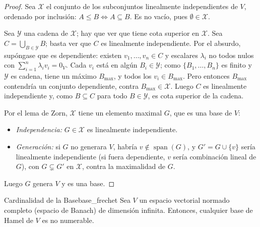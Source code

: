 \documentclass[11pt, a4paper]{article}
\begin{document}
\begin{proof}
Sea $\mathcal{X}$ el conjunto de los subconjuntos linealmente independientes de $V$, ordenado por inclusión: $A \le B \iff A \subseteq B$. Es no vacío, pues $\emptyset \in \mathcal{X}$.

Sea $\mathcal{Y}$ una cadena de $\mathcal{X}$; hay que ver que tiene cota superior en $\mathcal{X}$. Sea $C = \bigcup_{B \in \mathcal{Y}} B$; basta ver que $C$ es linealmente independiente. Por el absurdo, supóngase que es dependiente: existen $v_1, \dots, v_n \in C$ y escalares $\lambda_i$ no todos nulos con $\sum_{i=1}^n \lambda_i v_i = 0_V$. Cada $v_i$ está en algún $B_i \in \mathcal{Y}$; como $\{B_1, \dots, B_n\}$ es finito y $\mathcal{Y}$ es cadena, tiene un máximo $B_{\max}$, y todos los $v_i \in B_{\max}$. Pero entonces $B_{\max}$ contendría un conjunto dependiente, contra $B_{\max} \in \mathcal{X}$. Luego $C$ es linealmente independiente y, como $B \subseteq C$ para todo $B \in \mathcal{Y}$, es cota superior de la cadena.

Por el lema de Zorn, $\mathcal{X}$ tiene un elemento maximal $G$, que es una base de $V$:
\begin{itemize}
    \item \textit{Independencia:} $G \in \mathcal{X}$ es linealmente independiente.
    \item \textit{Generación:} si $G$ no generara $V$, habría $v \notin \operatorname{span}(G)$, y $G' = G \cup \{v\}$ sería linealmente independiente (si fuera dependiente, $v$ sería combinación lineal de $G$), con $G \subsetneq G'$ en $\mathcal{X}$, contra la maximalidad de $G$.
\end{itemize}
Luego $G$ genera $V$ y es una base.
\end{proof}

\begin{teorema}{Cardinalidad de la Base}{base_frechet}
Sea $V$ un espacio vectorial normado completo (espacio de Banach) de dimensión infinita.
Entonces, cualquier base de Hamel de $V$ es no numerable.
\end{teorema}
\end{document}
